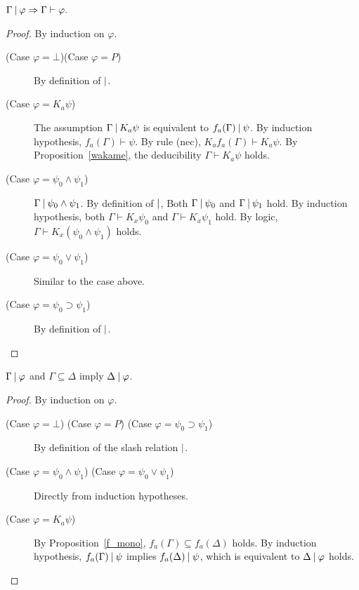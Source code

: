 \begin{lemma}
\label{ssound}
 $\Gamma\mathbin{\mid}\varphi\Rightarrow \Gamma\vdash\varphi.$
\end{lemma}
\begin{proof}
 By induction on $\varphi$.
 \begin{description}
  \item[ (Case $\varphi = \bot$)(Case $\varphi = P$)]
	     By definition of $\mathbin{\mid}$.
  \item[ (Case $\varphi = K_a\psi$)]
	     The assumption $\Gamma\mathbin{\mid} K_a\psi$ is equivalent to 
	     $f_a(\Gamma)\mathbin{\mid} \psi$.
	     By induction hypothesis,
	     $f_a(\Gamma)\vdash \psi$.
	     By rule (nec), 
	     $K_af_a(\Gamma)\vdash  K_a\psi$.
	     By Proposition~\ref{wakame},
	     the deducibility $\Gamma\vdash K_a\psi$ holds.
  \item[ (Case $\varphi = \psi_0 \wedge \psi_1$)]
	     $\Gamma\mathbin{\mid}\psi_0\wedge \psi_1$.
	     By definition of $\mathbin{\mid}$,
	     Both $\Gamma\mathbin{\mid}\psi_0$ and $\Gamma\mathbin{\mid}\psi_1$ hold.
	     By induction hypothesis,
	     both $\Gamma\vdash K_x\psi_0$ and
	     $\Gamma\vdash K_x\psi_1$ hold.
	     By logic, $\Gamma\vdash K_x(\psi_0\wedge\psi_1)$ holds.
  \item[ (Case $\varphi = \psi_0\vee\psi_1$)]
	     Similar to the case above.
  \item[ (Case $\varphi = \psi_0\supset \psi_1$)]
	     By definition of $\mathbin{\mid}$.
 \end{description}
\end{proof}

\begin{lemma}
 \label{aslash-mono}
$\Gamma\mathbin{\mid}\varphi$ and $\Gamma\subseteq \Delta$ imply $\Delta\mathbin{\mid}\varphi$.
\end{lemma}
\begin{proof}
 By induction on $\varphi$.
 \begin{description}
  \item[ (Case $\varphi=\bot$) (Case $\varphi =P$) (Case $\varphi =\psi_0\supset \psi_1$)]
	     By definition of the slash relation $\mathbin{\mid}$.
  \item[ (Case $\varphi =\psi_0\wedge\psi_1$) (Case $\varphi =\psi_0\vee\psi_1$)]
	     Directly from induction hypotheses.
  \item[ (Case $\varphi = K_a\psi$)]
	     By Proposition~\ref{f_mono},
	     $f_a(\Gamma)\subseteq f_a(\Delta)$ holds.
	     By induction hypothesis, $f_a(\Gamma)\mathbin{\mid} \psi$ implies
	     $f_a(\Delta)\mathbin{\mid}\psi$, which is equivalent to $\Delta\mathbin{\mid}\varphi$ holds.
 \end{description}
\end{proof}

